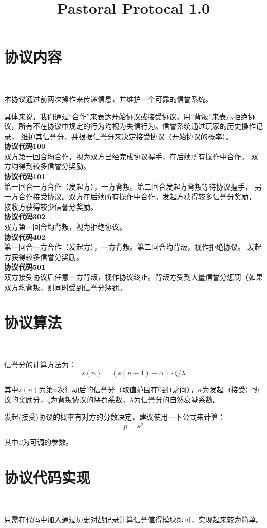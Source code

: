\documentclass[20pt]{article}
\title{Pastoral Protocal 1.0}
\begin{document}
\maketitle
\tableofcontents
\clearpage
\section{协议内容}\

本协议通过前两次操作来传递信息，并维护一个可靠的信誉系统。

具体来说，我们通过“合作”来表达开始协议或接受协议，用“背叛”来表示拒绝协议，所有不在协议中规定的行为均视为失信行为。信誉系统通过玩家的历史操作记录，
维护其信誉分，并根据信誉分来决定接受协议（开始协议的概率）。\\

\textbf{协议代码100} \\
双方第一回合均合作，视为双方已经完成协议握手，在后续所有操作中合作。
双方均得到较多信誉分奖励。\\

\textbf{协议代码101} \\
第一回合一方合作（发起方），一方背叛。第二回合发起方背叛等待协议握手，
另一方合作接受协议。双方在后续所有操作中合作。发起方获得较多信誉分奖励，
接收方获得较少信誉分奖励。\\

\textbf{协议代码302} \\
双方第一回合均背叛，视为拒绝协议。\\

\textbf{协议代码402} \\
第一回合一方合作（发起方），一方背叛。第二回合均背叛，视作拒绝协议。
发起方获得较多信誉分奖励。\\

\textbf{协议代码501} \\
双方接受协议后任意一方背叛，视作协议终止。背叛方受到大量信誉分惩罚（如果
双方均背叛，则同时受到信誉分惩罚。\\

\section{协议算法}\

信誉分的计算方法为：
\begin{equation}
    s(n) = (s(n-1) + \alpha) \cdot \zeta / \lambda
\end{equation}

其中$s(n)$为第$n$次行动后的信誉分（取值范围在$0$到$1$之间），$\alpha$为发起（接受）协议的奖励分，$\zeta$为背叛协议的惩罚系数，$\lambda$为信誉分的自然衰减系数。

发起(接受)协议的概率有对方的分数决定，建议使用一下公式来计算：
\begin{equation}
    p = s ^ \beta 
\end{equation}

其中$\beta$为可调的参数。

\section{协议代码实现}\

只需在代码中加入通过历史对战记录计算信誉值得模块即可，实现起来较为简单。
\end{document}
